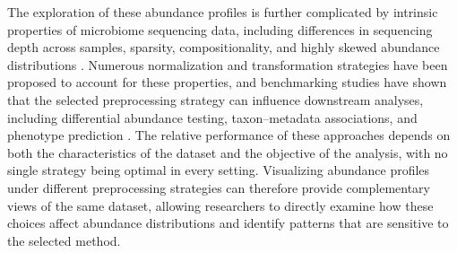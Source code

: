 The exploration of these abundance profiles is further complicated by intrinsic properties of microbiome sequencing data, including differences in sequencing depth across samples, sparsity, compositionality, and highly skewed abundance distributions \cite{weiss_normalization_2017,lin_analysis_2020,llorens-rico_benchmarking_2021}. Numerous normalization and transformation strategies have been proposed to account for these properties, and benchmarking studies have shown that the selected preprocessing strategy can influence downstream analyses, including differential abundance testing, taxon--metadata associations, and phenotype prediction \cite{weiss_normalization_2017,chen_gmpr_2018,llorens-rico_benchmarking_2021,nearing_microbiome_2022,wang_comparison_2024}. The relative performance of these approaches depends on both the characteristics of the dataset and the objective of the analysis, with no single strategy being optimal in every setting. Visualizing abundance profiles under different preprocessing strategies can therefore provide complementary views of the same dataset, allowing researchers to directly examine how these choices affect abundance distributions and identify patterns that are sensitive to the selected method.

